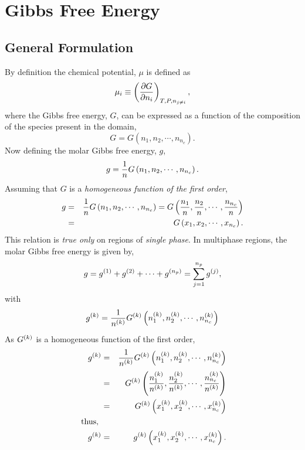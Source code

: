 \section{Gibbs Free Energy}\label{Chapter:ThermodynamicFormulation:Section:GibbsEnergy}

\subsection{General Formulation}
By definition the chemical potential, $\mu$ is defined as
\begin{equation}
   \mu_{i} \equiv \Partial[G]{n_{i}}{T,P,n_{j\ne i}},
\end{equation}
where the Gibbs free energy, $G$, can be expressed as a function of the composition of the species present in the domain,
\begin{equation}
   G = G\left(n_{1}, n_{2}, \cdots, n_{n_{c}}\right).
\end{equation}
Now defining the molar Gibbs free energy, $g$,
\begin{displaymath}
   g = \frc{1}{n}G\left(n_{1}, n_{2}, \cdots, n_{n_{c}}\right).
\end{displaymath}
Assuming that $G$ is a {\it homogeneous function of the first order},
\begin{eqnarray}
   g &=& \frc{1}{n}G\left(n_{1}, n_{2}, \cdots, n_{n_{c}}\right) = G\left(\frc{n_{1}}{n}, \frc{n_{2}}{n}, \cdots, \frc{n_{n_{c}}}{n}\right) \nonumber \\
     &=& G\left(x_{1}, x_{2}, \cdots, x_{n_{c}}\right). \nonumber
\end{eqnarray}
This relation is {\it true only} on regions of {\it single phase}. In multiphase regions, the molar Gibbs free energy is given by,
\begin{equation}
   g = \mfr[g]{}{1} + \mfr[g]{}{2} + \cdots + \mfr[g]{}{n_{p}} = \summation_{j=1}^{n_{p}}\mfr[g]{}{j},
\end{equation}
with
\begin{displaymath}
   \mfr[g]{}{k} = \frc{1}{\mfr[n]{}{k}} \mfr[G]{}{k}\left(\mfr[n]{1}{k}, \mfr[n]{2}{k}, \cdots, \mfr[n]{n_{c}}{k}\right)
\end{displaymath}
As $\mfr[G]{}{k}$ is a homogeneous function of the first order,
\begin{eqnarray}
 \mfr[g]{}{k} &=& \frc{1}{\mfr[n]{}{k}} \mfr[G]{}{k}\left(\mfr[n]{1}{k}, \mfr[n]{2}{k}, \cdots, \mfr[n]{n_{c}}{k}\right) \nonumber \\
              &=&  \mfr[G]{}{k}\left( \frc{\mfr[n]{1}{k}}{\mfr[n]{}{k}}, \frc{\mfr[n]{2}{k}}{\mfr[n]{}{k}}, \cdots, \frc{\mfr[n]{n_{c}}{k}}{\mfr[n]{}{k}}\right) \nonumber \\
              &=&  \mfr[G]{}{k}\left(\mfr[x]{1}{k}, \mfr[x]{2}{k}, \cdots, \mfr[x]{n_{c}}{k}\right) \nonumber \\
    \text{ thus, }     && \nonumber\\
\mfr[g]{}{k} &=&  \mfr[g]{}{k}\left(\mfr[x]{1}{k}, \mfr[x]{2}{k}, \cdots, \mfr[x]{n_{c}}{k}\right). 
\end{eqnarray}

